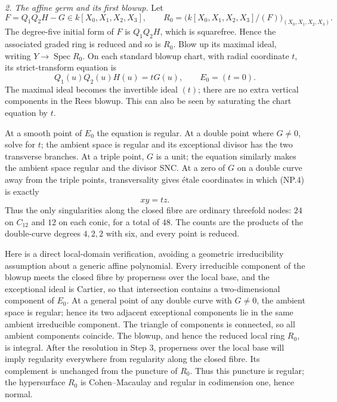 \emph{2. The affine germ and its first blowup.}
Let
\[
 F=Q_1Q_2H-G\in k[X_0,X_1,X_2,X_3],\qquad
 R_0=\bigl(k[X_0,X_1,X_2,X_3]/(F)\bigr)_{(X_0,X_1,X_2,X_3)}.
                                                        \tag{NP.3}
\]
The degree-five initial form of $F$ is $Q_1Q_2H$, which is squarefree.
Hence the associated graded ring is reduced and so is $R_0$.
Blow up its maximal ideal, writing $Y\to\operatorname{Spec}R_0$.
On each standard blowup chart, with radial coordinate $t$, its
strict-transform equation is
\begin{equation}
                   Q_1(u)Q_2(u)H(u)=tG(u),
             \qquad E_0=(t=0).                        \tag{NP.4}
\end{equation}
The maximal ideal becomes the invertible ideal $(t)$; there are
no extra vertical components in the Rees blowup. This can also be
seen by saturating the chart equation by $t$.

At a smooth point of $E_0$ the equation is regular. At a double
point where $G\ne0$, solve for $t$; the ambient space is regular
and its exceptional divisor has the two transverse branches.
At a triple point, $G$ is a unit; the equation similarly makes
the ambient space regular and the divisor SNC.
At a zero of $G$ on a double curve away from the triple points,
transversality gives étale coordinates in which (NP.4) is exactly
\begin{equation}
                         xy=tz.                        \tag{NP.5}
\end{equation}
Thus the only singularities along the closed fibre are ordinary
threefold nodes: $24$ on $C_{12}$ and $12$ on each conic, for a
total of $48$. The counts are the products of the double-curve
degrees $4,2,2$ with six, and every point is reduced.

Here is a direct local-domain verification, avoiding a geometric
irreducibility assumption about a generic affine polynomial.
Every irreducible component of the blowup meets the closed fibre
by properness over the local base, and the exceptional ideal is
Cartier, so that intersection contains a two-dimensional component
of $E_0$. At a general point of any double curve with $G\ne0$,
the ambient space is regular; hence its two adjacent exceptional
components lie in the same ambient irreducible component.
The triangle of components is connected, so all ambient components
coincide. The blowup, and hence the reduced local ring $R_0$, is
integral. After the resolution in Step 3, properness over the local
base will imply regularity everywhere from regularity along the
closed fibre. Its complement is unchanged from the puncture of
$R_0$. Thus this puncture is regular; the hypersurface $R_0$ is
Cohen--Macaulay and regular in codimension one, hence normal.

